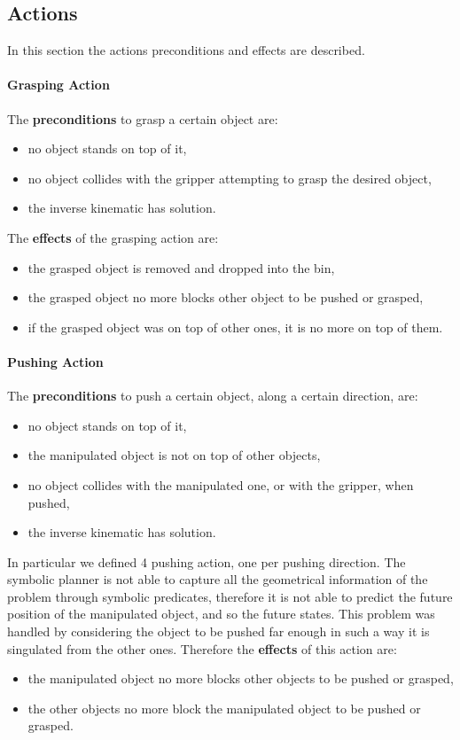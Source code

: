 \subsection{Actions}
In this section the actions preconditions and effects are described.

\paragraph{Grasping Action}
The \textbf{preconditions} to grasp a certain object are:
\begin{itemize}
\item no object stands on top of it,
\item no object collides with the gripper attempting to grasp the desired object,
\item the inverse kinematic has solution.
\end{itemize}
The \textbf{effects} of the grasping action are:
\begin{itemize}
\item the grasped object is removed and dropped into the bin,
\item the grasped object no more blocks other object to be pushed or grasped,
\item if the grasped object was on top of other ones, it is no more on top of them.
\end{itemize}  

\paragraph{Pushing Action}
The \textbf{preconditions} to push a certain object, along a certain direction, are:
\begin{itemize}
\item no object stands on top of it,
\item the manipulated object is not on top of other objects,
\item no object collides with the manipulated one, or with the gripper, when pushed,
\item the inverse kinematic has solution.
\end{itemize}
In particular we defined 4 pushing action, one per pushing direction. 
The symbolic planner is not able to capture all the geometrical information of the problem through symbolic predicates, therefore it is not able to predict the future position of the manipulated object, and so the future states. This problem was handled by considering the object to be pushed far enough in such a way it is singulated from the other ones.  
Therefore the \textbf{effects} of this action are:
\begin{itemize}
\item the manipulated object no more blocks other objects to be pushed or grasped,
\item the other objects no more block the manipulated object to be pushed or grasped.
\end{itemize}  

